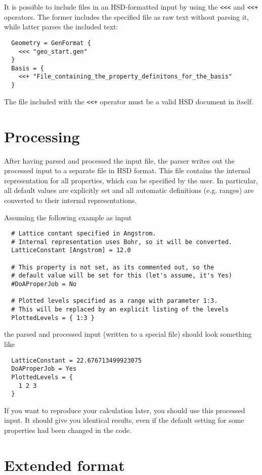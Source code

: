 It is possible to include files in an HSD-formatted input by using the
\verb|<<<| and \verb|<<+| operators. The former includes the specified
file as raw text without parsing it, while latter parses the included
text:
\begin{verbatim}
  Geometry = GenFormat {
    <<< "geo_start.gen"
  }
  Basis = {
    <<+ "File_containing_the_property_definitons_for_the_basis"
  }
\end{verbatim}
The file included with the \verb|<<+| operator must be a valid HSD
document in itself.


\section{Processing}

After having parsed and processed the input file, the parser writes
out the processed input to a separate file in HSD format. This file
contains the internal representation for all properties, which can be
specified by the user. In particular, all default values are explicitly
set and all automatic definitions (e.g. ranges) are converted to their
internal representations.

Assuming the following example as input
\begin{verbatim}
  # Lattice contant specified in Angstrom.
  # Internal representation uses Bohr, so it will be converted.
  LatticeConstant [Angstrom] = 12.0

  # This property is not set, as its commented out, so the
  # default value will be set for this (let's assume, it's Yes)
  #DoAProperJob = No

  # Plotted levels specified as a range with parameter 1:3.
  # This will be replaced by an explicit listing of the levels
  PlottedLevels = { 1:3 }
\end{verbatim}
the parsed and processed input (written to a special file) should look
something like
\begin{verbatim}
  LatticeConstant = 22.676713499923075
  DoAProperJob = Yes
  PlottedLevels = {
    1 2 3
  }
\end{verbatim}
If you want to reproduce your calculation later, you should use this
processed input. It should give you identical results, even if the
default setting for some properties had been changed in the code.

\section{Extended format}
\label{sec:hsdext}

